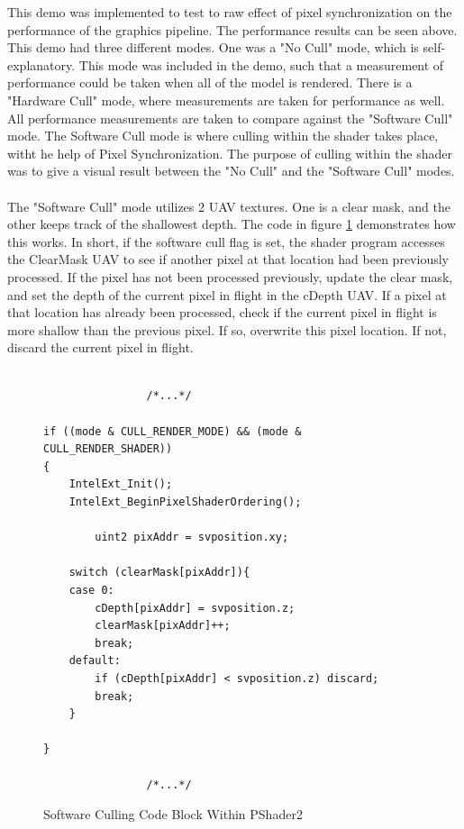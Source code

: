 \documentclass[a4paper, 12pt]{article}
\begin{document}
This demo was implemented to test to raw effect of pixel synchronization on
the performance of the graphics pipeline. The performance results can be seen
above. This demo had three different modes. One was a "No Cull" mode, which is
self-explanatory. This mode was included in the demo, such that a measurement
of performance could be taken when all of the model is rendered. There is a
"Hardware Cull" mode, where measurements are taken for performance as well.
All performance measurements are taken to compare against the "Software Cull"
mode. The Software Cull mode is where culling within the shader takes place,
witht he help of Pixel Synchronization. The purpose of culling within the
shader was to give a visual result between the "No Cull" and the "Software
Cull" modes. \\ \\ The "Software Cull" mode utilizes 2 UAV textures. One is a
clear mask, and the other keeps track of the shallowest depth. The code in
figure \ref{code:softCull} demonstrates how this works. In short, if the
software cull flag is set, the shader program accesses the ClearMask UAV to
see if another pixel at that location had been previously processed. If the
pixel has not been processed previously, update the clear mask, and set the
depth of the current pixel in flight in the cDepth UAV. If a pixel at that
location has already been processed, check if the current pixel in flight is
more shallow than the previous pixel. If so, overwrite this pixel location. If
not, discard the current pixel in flight.

\begin{figure}[!htb]
\begin{lstlisting}[language=HLSL]

			    /*...*/

if ((mode & CULL_RENDER_MODE) && (mode & CULL_RENDER_SHADER))
{
	IntelExt_Init();
	IntelExt_BeginPixelShaderOrdering();

		uint2 pixAddr = svposition.xy;

	switch (clearMask[pixAddr]){
	case 0:
		cDepth[pixAddr] = svposition.z;
		clearMask[pixAddr]++;
		break;
	default:
		if (cDepth[pixAddr] < svposition.z) discard;
		break;
	}

}

			    /*...*/

\end{lstlisting}
\caption{Software Culling Code Block Within PShader2}
\label{code:softCull}
\end{figure}
\end{document}
